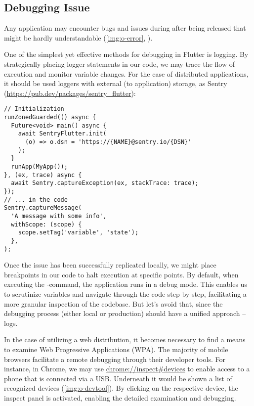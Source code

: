 
\subsection{Debugging Issue}

Any application may encounter bugs and issues during after being released that might be hardly understandable 
(\cref{img:o-error}, ).


\noindent One of the simplest yet effective methods for debugging in Flutter is logging. By strategically placing logger 
statements in our code, we may trace the flow of execution and monitor variable changes. For the case of distributed 
applications, it should be used loggers with external (to application) storage, as Sentry
(\href{https://pub.dev/packages/sentry\_flutter}{https://pub.dev/packages/sentry\_flutter}):

\begin{lstlisting}
// Initialization
runZonedGuarded(() async {
  Future<void> main() async {
    await SentryFlutter.init(
      (o) => o.dsn = 'https://{NAME}@sentry.io/{DSN}'
    );
  }
  runApp(MyApp());
}, (ex, trace) async {
  await Sentry.captureException(ex, stackTrace: trace);
});
// ... in the code
Sentry.captureMessage(
  'A message with some info',
  withScope: (scope) {
    scope.setTag('variable', 'state');
  },
);
\end{lstlisting}

\noindent Once the issue has been successfully replicated locally, we might place breakpoints in our code to halt 
execution at specific points. By default, when executing the -command, the application runs in a
debug mode. This enables us to scrutinize variables and navigate through the code step by step, facilitating a more 
granular inspection of the codebase. But let's avoid that, since the debugging process (either local or production) 
should have a unified approach -- logs.

In the case of utilizing a web distribution, it becomes necessary to find a means to examine Web Progressive Applications 
(WPA). The majority of mobile browsers facilitate a remote debugging through their developer tools. For instance, 
in Chrome, we may use \href{chrome://inspect\#devices}{chrome://inspect\#devices} to enable access to a phone that is 
connected via a USB. Underneath it would be shown a list of recognized devices (\cref{img:o-devtool}). By clicking on 
the respective device, the inspect panel is activated, enabling the detailed examination and debugging.

